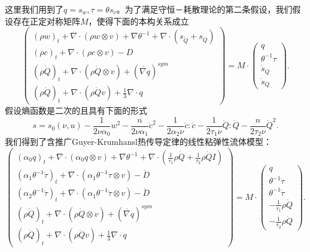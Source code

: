 这里我们用到了$q=s_w,\tau = \theta s_c$。为了满足守恒－耗散理论的第二条假设，我们假设存在正定对称矩阵$M$，使得下面的本构关系成立
\begin{equation*}
   	\left( \begin{array}{c} 
			(\rho w)_t +  \nabla \cdot (\rho w \otimes v)  + \nabla \theta^{-1} + \nabla \cdot (s_{\mathring{{Q}}}+s_{\dot{Q}})\\
			(\rho c)_t +  \nabla \cdot (\rho c \otimes v)  - D \\
			(\rho \mathring{{Q}})_t + \nabla \cdot (\rho \mathring{Q} \otimes v)+(\mathring{\nabla {q}})^{sym} \\ (\rho \dot{Q})_t + \nabla \cdot (\rho \dot{Q} v)+\frac{1}{3} \nabla \cdot {q}
		\end{array} \right) = M \cdot
		\left( \begin{array}{c} 
			q \\ \theta^{-1} \tau \\\mathring{s}_Q \\\dot{s}_Q
		\end{array}\right).
\end{equation*} 
假设熵函数是二次的且具有下面的形式
	\begin{equation*}
		s = s_0(\nu,u)  - \frac{1}{2\nu \alpha_0} w^2 - \frac{n}{2\nu \alpha_1} \dot{c}^2- \frac{1}{2\alpha_2 \nu} \mathring{c}:\mathring{c} - \frac{1}{2 \tau_1 \nu} \mathring{Q}: \mathring{Q} - \frac{n}{2  \tau_2 \nu} \dot{Q}^2.
 	\end{equation*}  
我们得到了含推广Guyer-Krumhansl热传导定律的线性粘弹性流体模型：
\begin{equation}\label{eq:CNSTgeneral}
   	\left( \begin{array}{c} 
			(\alpha_0 q)_t +  \nabla \cdot (\alpha_0  q \otimes v)  + \nabla \theta^{-1} + \nabla \cdot (\frac{1}{\tau_1} \rho \mathring{{Q}}+\frac{1}{\tau_2} \rho \dot{Q} I)\\
			(\alpha_1 \theta^{-1} \dot{\tau})_t +  \nabla \cdot (\alpha_1 \theta^{-1} \dot{\tau} \otimes v)  - \dot{D} \\
			(\alpha_2 \theta^{-1} \mathring{\tau})_t +  \nabla \cdot (\alpha_1 \theta^{-1} \mathring{\tau} \otimes v)  - \mathring{D} \\
			(\rho \mathring{{Q}})_t + \nabla \cdot (\rho \mathring{Q} \otimes v)+(\mathring{\nabla {q}})^{sym} \\ (\rho \dot{Q})_t + \nabla \cdot (\rho \dot{Q} v)+\frac{1}{3} \nabla \cdot {q}
		\end{array} \right) = M \cdot
		\left( \begin{array}{c} 
			q \\ \theta^{-1} \dot{\tau} \\ \theta^{-1} \mathring{\tau} \\ -\frac{1}{\tau_1} \rho \mathring{{Q}} \\ -\frac{1}{\tau_2} \rho \dot{{Q}}
		\end{array}\right).
\end{equation}
